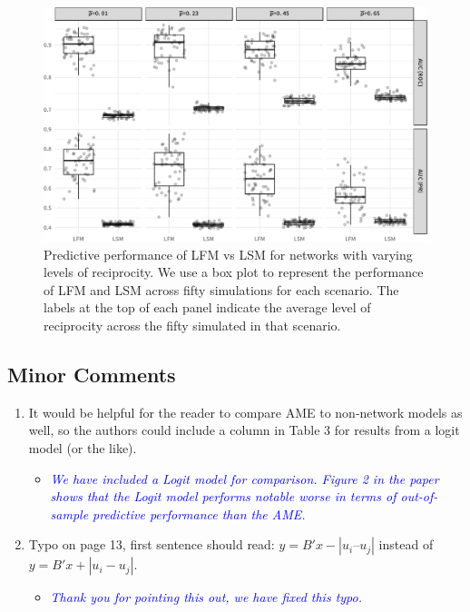 \begin{enumerate}
\begin{itemize}
\begin{figure}[ht]
				\includegraphics[width=1\textwidth]{sim2Viz.pdf}
				\caption{Predictive performance of LFM vs LSM for networks with varying levels of reciprocity. We use a box plot to represent the performance of LFM and LSM across fifty simulations for each scenario. The labels at the top of each panel indicate the average level of reciprocity across the fifty simulated in that scenario.}
				\label{fig:sim_recip}		
			\end{figure}
	\end{itemize}
\end{enumerate}

\subsection{Minor Comments}

\begin{enumerate}
	\item It would be helpful for the reader to compare AME to non-network models as well, so the authors could include a column in Table 3 for results from a logit model (or the like). 
	\begin{itemize}
		\item \textcolor{blue}{ \emph{
		We have included a Logit model for comparison. Figure 2 in the paper shows that the Logit model performs notable worse in terms of out-of-sample predictive performance than the AME.
		}}
	\end{itemize}		
	\item Typo on page 13, first sentence should read: $y = B'x - |u_i – u_j|$ instead of $y = B'x + |u_i - u_j|$.
	\begin{itemize}
		\item \textcolor{blue}{ \emph{
		Thank you for pointing this out, we have fixed this typo.
		}}
	\end{itemize}		
\end{enumerate}

